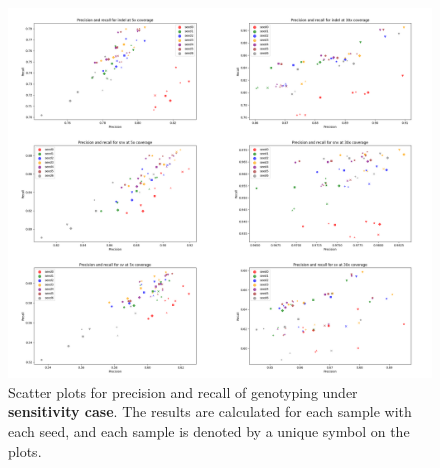 \documentclass{PHlab-thesis}
\begin{document}
\clearpage
\begin{figure}[ht!]
	\centering
	\includegraphics[scale=0.3]{figures/Sensitivity_genotyping.png}
	\caption{Scatter plots for precision and recall of genotyping under \textbf{sensitivity case}. The results are calculated for each sample with each seed, and each sample is denoted by a unique symbol on the plots.}
	\label{fig:sensitivity_genotyping} %
\end{figure}
\end{document}
